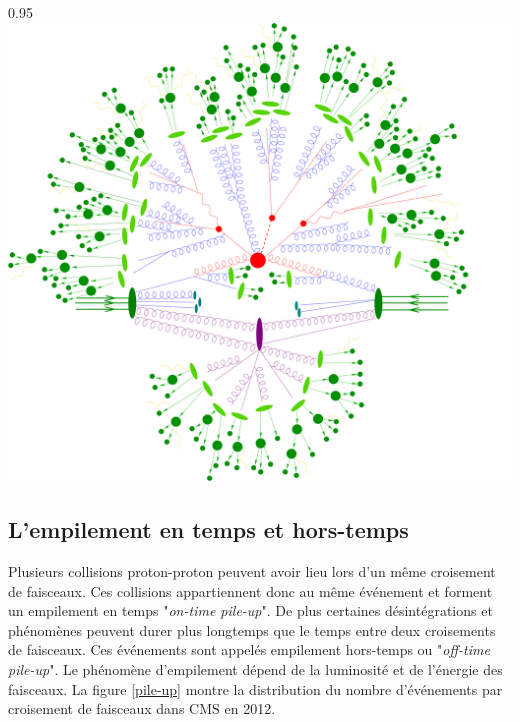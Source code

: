 \begin{minipagewithmarginpars}[ht!]{0.95\textwidth}
	\centering
	\includegraphics[width=1.0\textwidth]{LHC/event.jpg}
	\label{collision2}	
\end{minipagewithmarginpars}

\subsection{L'empilement en temps et hors-temps}
Plusieurs collisions proton-proton peuvent avoir lieu lors d'un même croisement de faisceaux. Ces collisions appartiennent donc au même événement et forment un empilement en temps "\textit{on-time pile-up}". De plus certaines désintégrations et phénomènes peuvent durer plus longtemps que le temps entre deux croisements de faisceaux. Ces événements sont appelés empilement hors-temps ou "\textit{off-time pile-up}". Le phénomène d'empilement dépend de la luminosité et de l'énergie des faisceaux. La figure \ref{pile-up} montre la distribution du nombre d'événements par croisement de faisceaux dans CMS en \num{2012}.

